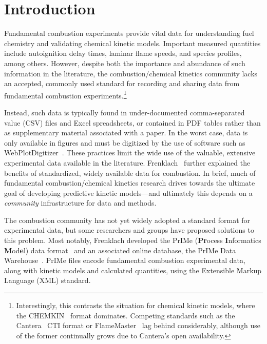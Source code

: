 \documentclass[12pt]{ussci}
\begin{document}
\section{Introduction}
%
Fundamental combustion experiments provide vital data for understanding fuel
chemistry and validating chemical kinetic models. Important measured quantities
include autoignition delay times, laminar flame speeds, and species profiles,
among others. However, despite both the importance and abundance of such
information in the literature, the combustion\slash chemical kinetics community
lacks an accepted, commonly used standard for recording and sharing data from
fundamental combustion experiments.\footnote{Interestingly, this contrasts the
situation for chemical kinetic models, where the CHEMKIN~\autocite{Kee:1996ck}
format dominates. Competing standards such as the
Cantera~\autocite{Cantera:2.3.0} CTI format or
FlameMaster~\autocite{FlameMaster:ref,FlameMaster:code} lag behind considerably,
although use of the former continually grows due to Cantera's open availability.
}

Instead, such data is typically found in under-documented comma-separated value (CSV)
files and Excel spreadsheets, or contained in PDF tables rather than as
supplementary material associated with a paper. In the worst case, data is only
available in figures and must be digitized by the use of software such as
WebPlotDigitizer~\autocite{WebPlotDigitizer}. These practices limit the wide use
of the valuable, extensive experimental data available in the literature.
Frenklach~\autocite{Frenklach:2007bm} further explained the benefits of
standardized, widely available data for combustion. In brief, much of
fundamental combustion\slash chemical kinetics research drives towards the
ultimate goal of developing predictive kinetic models---and ultimately this
depends on a \emph{community} infrastructure for data and methods.

The combustion community has not yet widely adopted a standard format for
experimental data, but some researchers and groups have proposed solutions to
this problem. Most notably, Frenklach developed the PrIMe (\textbf{Pr}ocess
\textbf{I}nformatics \textbf{M}od\textbf{e}l) data
format~\autocite{Frenklach:2007bm,You:2011hy} and an associated online database,
the PrIMe Data Warehouse~\autocite{PrIMe}. PrIMe files encode fundamental
combustion experimental data, along with kinetic models and calculated
quantities, using the Extensible Markup Language (XML) standard.
\end{document}
